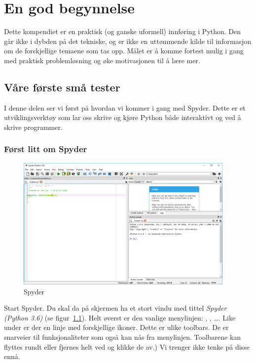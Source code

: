 \chapter{En god begynnelse}
Dette kompendiet er en praktisk (og ganske uformell) innføring i Python. Den går ikke i dybden på det tekniske, og er ikke en uttømmende kilde til informasjon om de forskjellige temaene som tas opp. Målet er å komme fortest mulig i gang med praktisk problemløsning og øke motivasjonen til å lære mer.

\section{Våre første små tester}

I denne delen ser vi først på hvordan vi kommer i gang med Spyder. Dette er et utviklingsverktøy som lar oss skrive og kjøre Python både interaktivt og ved å skrive programmer.

\subsection{Først litt om Spyder}
\begin{figure}[t]
\begin{center}
\includegraphics[width=0.95\textwidth]{img/spyder_overview.png}
\end{center}
\caption{Spyder}
\label{fig:spyder_overview}
\end{figure}

Start Spyder. Du skal da på skjermen ha et stort vindu med tittel \emph{Spyder (Python 3.6)} (se figur~\ref{fig:spyder_overview}). Helt øverst er den vanlige menylinjen: , , \ldots. Like under er der en linje med forskjellige ikoner. Dette er ulike toolbars. De er snarveier til funksjonaliteter som også kan nås fra menylinjen. Toolbarene kan flyttes rundt eller fjernes helt ved \usnsubmenusep{} og klikke de av.) Vi trenger ikke tenke på disse ennå. 

